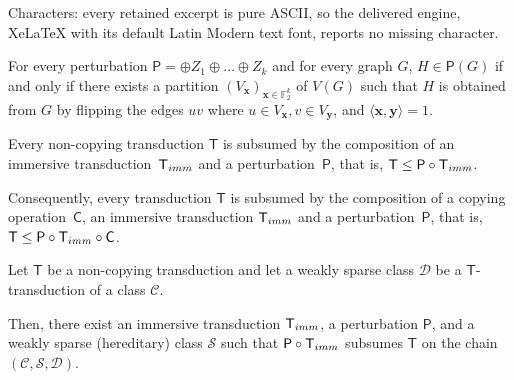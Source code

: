 \documentclass[10pt,a4paper]{amsart}
\newcommand{\Cc}{\mathscr{C}}
\newcommand{\Dd}{\mathscr{D}}
\newcommand{\Ss}{\mathscr{S}}
\begin{document}
Characters: every retained excerpt is pure ASCII, so the delivered engine, XeLaTeX with its default Latin Modern text font, reports no missing character.
\begin{lem}
	\label{lem:perturb}
	For every perturbation $\mathsf P=\oplus Z_1\oplus\dots\oplus Z_k$ and for every graph $G$, $H\in{\mathsf P}(G)$ if and only if there exists a partition $(V_\mathbf x)_{\mathbf x\in \mathbb{F}_2^k}$ of $V(G)$ such that $H$ is obtained from $G$ by flipping the edges $uv$ where $u\in V_{\mathbf x}, v\in V_{\mathbf y}$, and $\langle\mathbf x,\mathbf y\rangle=1$.
\end{lem}

\begin{thm}
	\label{thm:normal}
	Every non-copying transduction $\mathsf T$ is subsumed by the composition of an immersive transduction~$\mathsf T_{\rm imm}$ and a perturbation~$\mathsf P$, that is, $\mathsf T\leq \mathsf P\circ\mathsf T_{\rm imm}$.
	
	Consequently, every transduction $\mathsf T$ is subsumed by the composition of a
	copying operation~$\mathsf C$, an immersive transduction $\mathsf T_{\rm imm}$ and a perturbation~$\mathsf P$, that is, $\mathsf T\leq \mathsf P\circ\mathsf T_{\rm imm}\circ\mathsf C$.
\end{thm}

\begin{thm}
	\label{thm:rel-normal}
	Let  $\mathsf T$ be a non-copying transduction and let a  weakly sparse  class $\Dd$ be a $\mathsf T$-transduction  of a class $\Cc$.
	
	Then, there exist an immersive transduction $\mathsf T_{\rm imm}$, a perturbation $\mathsf P$, and a weakly sparse (hereditary)  class $\Ss$ such that 
	$\mathsf P\circ\mathsf T_{\rm imm}$ subsumes $\mathsf T$ on the chain $(\Cc,\Ss,\Dd)$.
\end{thm}
\end{document}
